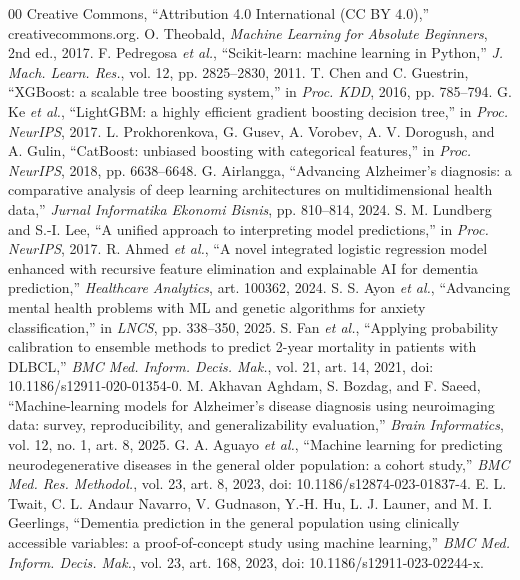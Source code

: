 \documentclass[conference]{IEEEtran}
\begin{document}
\begin{thebibliography}{00}
 Creative Commons, ``Attribution 4.0 International (CC BY 4.0),'' creativecommons.org.
 O. Theobald, \textit{Machine Learning for Absolute Beginners}, 2nd ed., 2017.
 F. Pedregosa \textit{et al.}, ``Scikit-learn: machine learning in Python,'' \textit{J. Mach. Learn. Res.}, vol. 12, pp. 2825--2830, 2011.
 T. Chen and C. Guestrin, ``XGBoost: a scalable tree boosting system,'' in \textit{Proc. KDD}, 2016, pp. 785--794.
 G. Ke \textit{et al.}, ``LightGBM: a highly efficient gradient boosting decision tree,'' in \textit{Proc. NeurIPS}, 2017.
 L. Prokhorenkova, G. Gusev, A. Vorobev, A. V. Dorogush, and A. Gulin, ``CatBoost: unbiased boosting with categorical features,'' in \textit{Proc. NeurIPS}, 2018, pp. 6638--6648.
 G. Airlangga, ``Advancing Alzheimer's diagnosis: a comparative analysis of deep learning architectures on multidimensional health data,'' \textit{Jurnal Informatika Ekonomi Bisnis}, pp. 810--814, 2024.
 S. M. Lundberg and S.-I. Lee, ``A unified approach to interpreting model predictions,'' in \textit{Proc. NeurIPS}, 2017.
 R. Ahmed \textit{et al.}, ``A novel integrated logistic regression model enhanced with recursive feature elimination and explainable AI for dementia prediction,'' \textit{Healthcare Analytics}, art. 100362, 2024.
 S. S. Ayon \textit{et al.}, ``Advancing mental health problems with ML and genetic algorithms for anxiety classification,'' in \textit{LNCS}, pp. 338--350, 2025.
 S. Fan \textit{et al.}, ``Applying probability calibration to ensemble methods to predict 2-year mortality in patients with DLBCL,'' \textit{BMC Med. Inform. Decis. Mak.}, vol. 21, art. 14, 2021, doi: 10.1186/s12911-020-01354-0.
 M. Akhavan Aghdam, S. Bozdag, and F. Saeed, ``Machine-learning models for Alzheimer's disease diagnosis using neuroimaging data: survey, reproducibility, and generalizability evaluation,'' \textit{Brain Informatics}, vol. 12, no. 1, art. 8, 2025.
 G. A. Aguayo \textit{et al.}, ``Machine learning for predicting neurodegenerative diseases in the general older population: a cohort study,'' \textit{BMC Med. Res. Methodol.}, vol. 23, art. 8, 2023, doi: 10.1186/s12874-023-01837-4.
 E. L. Twait, C. L. Andaur Navarro, V. Gudnason, Y.-H. Hu, L. J. Launer, and M. I. Geerlings, ``Dementia prediction in the general population using clinically accessible variables: a proof-of-concept study using machine learning,'' \textit{BMC Med. Inform. Decis. Mak.}, vol. 23, art. 168, 2023, doi: 10.1186/s12911-023-02244-x.

\end{thebibliography}
\end{document}
